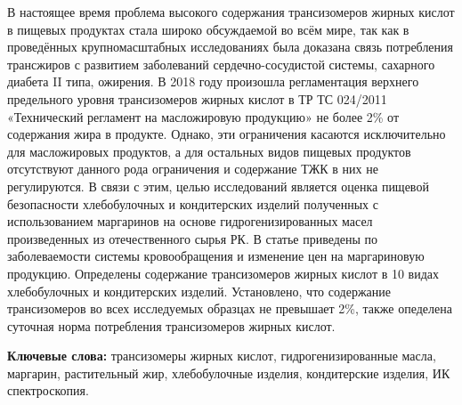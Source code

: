В настоящее время проблема высокого содержания трансизомеров жирных
кислот в пищевых продуктах стала широко обсуждаемой во всём мире, так
как в проведённых крупномасштабных исследованиях была доказана связь
потребления трансжиров с развитием заболеваний сердечно-сосудистой
системы, сахарного диабета II типа, ожирения. В 2018 году произошла
регламентация верхнего предельного уровня трансизомеров жирных кислот в
ТР ТС 024/2011 «Технический регламент на масложировую продукцию» не
более 2\% от содержания жира в продукте. Однако, эти ограничения
касаются исключительно для масложировых продуктов, а для остальных видов
пищевых продуктов отсутствуют данного рода ограничения и содержание ТЖК
в них не регулируются. В связи с этим, целью исследований является
оценка пищевой безопасности хлебобулочных и кондитерских изделий
полученных с использованием маргаринов на основе гидрогенизированных
масел произведенных из отечественного сырья РК. В статье приведены по
заболеваемости системы кровообращения и изменение цен на маргариновую
продукцию. Определены содержание трансизомеров жирных кислот в 10 видах
хлебобулочных и кондитерских изделий. Установлено, что содержание
трансизомеров во всех исследуемых образцах не превышает 2\%, также
опеделена суточная норма потребления трансизомеров жирных кислот.

{\bfseries Ключевые слова:} трансизомеры жирных кислот, гидрогенизированные
масла, маргарин, растительный жир, хлебобулочные изделия, кондитерские
изделия, ИК спектроскопия.

